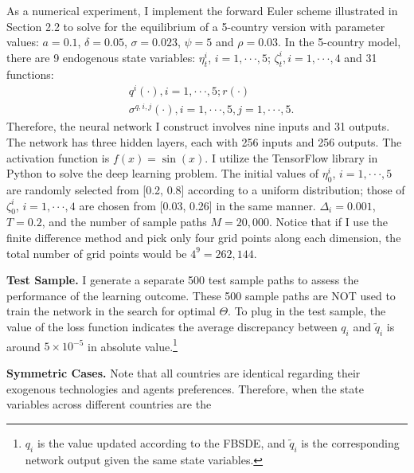 \documentclass{article}
\begin{document}
As a numerical experiment, I implement the forward Euler scheme illustrated in Section 2.2 to solve for the equilibrium of a 5-country version with parameter values: $a=0.1$, $\delta=0.05$, $\sigma=0.023$, $\psi=5$ and $\rho=0.03$. In the 5-country model, there are 9 endogenous state variables: $\eta_{t}^{i}$, $i=1,\cdot\cdot\cdot,5$; $\zeta_{t}^{i},i=1,\cdot\cdot\cdot,4$ and 31 functions:
\begin{align*}
&q^{i}(\cdot),i=1,\cdot\cdot\cdot,5;r(\cdot) \\
&\sigma^{q,i,j}(\cdot),i=1,\cdot\cdot\cdot,5,j=1,\cdot\cdot\cdot,5.
\end{align*}
Therefore, the neural network I construct involves nine inputs and 31 outputs. The network has three hidden layers, each with 256 inputs and 256 outputs. The activation function is $f(x)=\sin(x)$. I utilize the TensorFlow library in Python to solve the deep learning problem. The initial values of $\eta_{0}^{i}$, $i=1,\cdot\cdot\cdot,5$ are randomly selected from [0.2, 0.8] according to a uniform distribution; those of $\zeta_{0}^{i}$, $i=1,\cdot\cdot\cdot,4$ are chosen from [0.03, 0.26] in the same manner. $\Delta_{i}=0.001$, $T=0.2$, and the number of sample paths $M=20,000$. Notice that if I use the finite difference method and pick only four grid points along each dimension, the total number of grid points would be $4^{9}=262,144$.

\textbf{Test Sample.} I generate a separate 500 test sample paths to assess the performance of the learning outcome. These 500 sample paths are NOT used to train the network in the search for optimal $\Theta$. To plug in the test sample, the value of the loss function indicates the average discrepancy between $q_{i}$ and $\tilde{q}_{i}$ is around $5\times10^{-5}$ in absolute value.\footnote{$q_{i}$ is the value updated according to the FBSDE, and $\tilde{q}_{i}$ is the corresponding network output given the same state variables.}

\textbf{Symmetric Cases.} Note that all countries are identical regarding their exogenous technologies and agents preferences. Therefore, when the state variables across different countries are the

\clearpage
\end{document}
